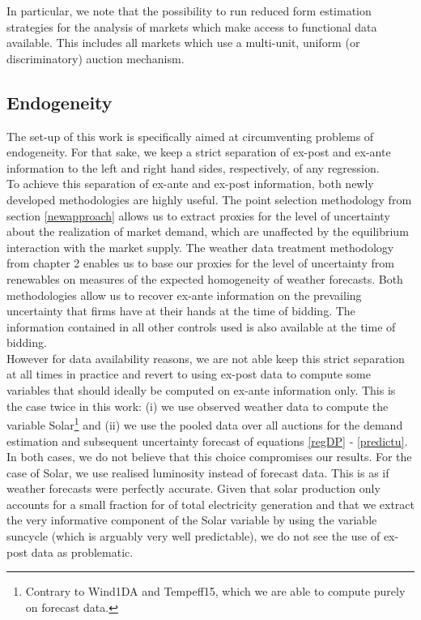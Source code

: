 In particular, we note that the possibility to run reduced form estimation strategies for the analysis of markets which make access to functional data available. This includes all markets which use a multi-unit, uniform (or discriminatory) auction mechanism. \\


\subsection{Endogeneity}
\label{endogeneityconcern}
The set-up of this work is specifically aimed at  circumventing problems of endogeneity. For that sake, we keep a strict separation of ex-post and ex-ante information to the left and right hand sides, respectively, of any regression. \\

To achieve this separation of ex-ante and ex-post information, both newly developed methodologies are highly useful. The point selection methodology from section \ref{newapproach} allows us to extract proxies for the level of uncertainty about the realization of market demand, which are unaffected by the equilibrium interaction with the market supply.
The weather data treatment methodology from chapter 2 enables us to base our proxies for the level of uncertainty from renewables on measures of the expected homogeneity of weather forecasts. 
Both methodologies allow us to recover ex-ante information on the prevailing uncertainty that firms have at their hands at the time of bidding. The information contained in all other controls used is also available at the time of bidding. \\

However for data availability reasons, we are not able keep this strict separation at all times in practice and revert to using ex-post data to compute some variables that should ideally be computed on ex-ante information only. This is the case twice in this work: (i) we use observed weather data to compute the variable Solar\footnote{Contrary to Wind1DA and Tempeff15, which we are able to compute purely on forecast data.} and (ii) we use the pooled data over all auctions for the demand estimation and subsequent uncertainty forecast of equations \ref{regDP} - \ref{predictu}.\\ 

In both cases, we do not believe that this choice compromises our results.
For the case of Solar, we use realised luminosity instead of forecast data. This is as if weather forecasts were perfectly accurate. 
Given that solar production only accounts for a small fraction for of total electricity generation and that we extract the very informative component of the Solar variable by using the variable suncycle (which is arguably very well predictable), we do not see the use of ex-post data as problematic. \\

